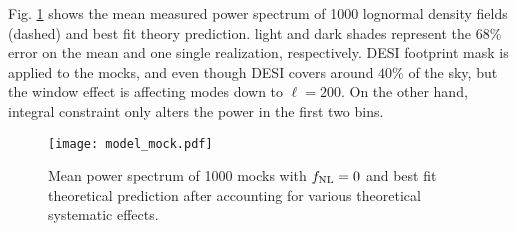 Fig. \ref{fig:model_mock} shows the mean measured power spectrum of 1000 lognormal density fields (dashed) and best fit theory prediction. light and dark shades represent the 68\% error on the mean and one single realization, respectively. DESI footprint mask is applied to the mocks, and even though DESI covers around $40\%$ of the sky, but the window effect is affecting modes down to $\ell=200$. On the other hand, integral constraint only alters the power in the first two bins. 

\begin{figure}
\centering
\texttt{[image: model\_mock.pdf]}
\caption{Mean power spectrum of 1000 mocks with $f_{\rm NL}=0$ and best fit theoretical prediction after accounting for various theoretical systematic effects.}\label{fig:model_mock}
\end{figure}


